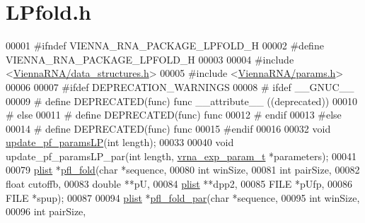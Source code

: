 \hypertarget{LPfold_8h_source}{}\section{L\+Pfold.\+h}
\label{LPfold_8h_source}

\begin{DoxyCode}
00001 \textcolor{preprocessor}{#ifndef VIENNA\_RNA\_PACKAGE\_LPFOLD\_H}
00002 \textcolor{preprocessor}{#define VIENNA\_RNA\_PACKAGE\_LPFOLD\_H}
00003 
00004 \textcolor{preprocessor}{#include <\mbox{\hyperlink{data__structures_8h}{ViennaRNA/data\_structures.h}}>}
00005 \textcolor{preprocessor}{#include <\mbox{\hyperlink{params_8h}{ViennaRNA/params.h}}>}
00006 
00007 \textcolor{preprocessor}{#ifdef DEPRECATION\_WARNINGS}
00008 \textcolor{preprocessor}{# ifdef \_\_GNUC\_\_}
00009 \textcolor{preprocessor}{#  define DEPRECATED(func) func \_\_attribute\_\_ ((deprecated))}
00010 \textcolor{preprocessor}{# else}
00011 \textcolor{preprocessor}{#  define DEPRECATED(func) func}
00012 \textcolor{preprocessor}{# endif}
00013 \textcolor{preprocessor}{#else}
00014 \textcolor{preprocessor}{# define DEPRECATED(func) func}
00015 \textcolor{preprocessor}{#endif}
00016 
00032 \textcolor{keywordtype}{void} \mbox{\hyperlink{group__local__pf__fold_ga5a019014d37fe6105131dfc2fc447880}{update\_pf\_paramsLP}}(\textcolor{keywordtype}{int} length);
00033 
00040 \textcolor{keywordtype}{void} update\_pf\_paramsLP\_par(\textcolor{keywordtype}{int} length, \mbox{\hyperlink{group__energy__parameters_structvrna__exp__param__s}{vrna\_exp\_param\_t}} *parameters);
00041 
00079 \mbox{\hyperlink{group__data__structures_structvrna__plist__s}{plist}} *\mbox{\hyperlink{group__local__pf__fold_ga7dcf599d07258801ea55e7d14a56908d}{pfl\_fold}}(\textcolor{keywordtype}{char} *sequence,
00080                 \textcolor{keywordtype}{int} winSize,
00081                 \textcolor{keywordtype}{int} pairSize,
00082                 \textcolor{keywordtype}{float} cutoffb,
00083                 \textcolor{keywordtype}{double} **pU,
00084                 \mbox{\hyperlink{group__data__structures_structvrna__plist__s}{plist}} **dpp2,
00085                 FILE *pUfp,
00086                 FILE *spup);
00087 
00094 \mbox{\hyperlink{group__data__structures_structvrna__plist__s}{plist}} *\mbox{\hyperlink{group__local__pf__fold_ga14c2b82fdd5ab7a1951f1c2db4f5cf2c}{pfl\_fold\_par}}(\textcolor{keywordtype}{char} *sequence,
00095                     \textcolor{keywordtype}{int} winSize,
00096                     \textcolor{keywordtype}{int} pairSize,

\end{DoxyCode}
